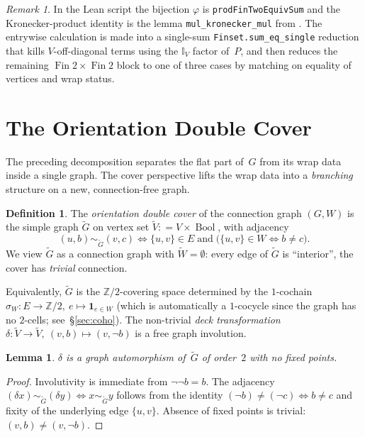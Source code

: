 \documentclass[11pt,a4paper]{amsart}
\theoremstyle{plain}
\newtheorem{lemma}[theorem]{Lemma}
\theoremstyle{definition}
\newtheorem{definition}[theorem]{Definition}
\theoremstyle{remark}
\newtheorem{remark}[theorem]{Remark}
\newcommand{\ZZ}{\mathbb{Z}}
\newcommand{\II}{\mathbb{I}}
\newcommand{\tG}{\widetilde{G}}
\newcommand{\tV}{\widetilde{V}}
\newcommand{\defeq}{\mathrel{\mathop:}=}
\begin{document}
\begin{remark}
In the Lean script the bijection $\varphi$ is
\texttt{prodFinTwoEquivSum} and the Kronecker-product
identity is the lemma \texttt{mul\_kronecker\_mul} from
. The entrywise
calculation is made into a single-sum \texttt{Finset.sum\_eq\_single}
reduction that kills $V$-off-diagonal terms using the
$\II_V$ factor of~$P$, and then reduces the remaining
$\operatorname{Fin}2\times \operatorname{Fin}2$ block to one of
three cases by matching on equality of vertices and wrap status.
\end{remark}

\section{The Orientation Double Cover}\label{sec:cover}

The preceding decomposition separates the flat part of~$G$ from
its wrap data inside a single graph. The cover perspective lifts
the wrap data into a \emph{branching} structure on a new,
connection-free graph.

\begin{definition}\label{def:cover}
The \emph{orientation double cover} of the connection graph
$(G,W)$ is the simple graph $\tG$ on vertex set
$\tV \defeq V\times \operatorname{Bool}$, with adjacency
\[
  (u,b)\sim_{\tG} (v,c) \iff
    \{u,v\}\in E \;\text{and}\; \bigl(\{u,v\}\in W \Leftrightarrow b\ne c\bigr).
\]
We view $\tG$ as a connection graph with $\widetilde W=\emptyset$:
every edge of $\tG$ is ``interior'', the cover has \emph{trivial}
connection.
\end{definition}

Equivalently, $\tG$ is the $\ZZ/2$-covering space determined by
the $1$-cochain $\sigma_W:E\to \ZZ/2,\ e\mapsto \mathbf{1}_{e\in W}$
(which is automatically a $1$-cocycle since the graph has no
$2$-cells; see~\S\ref{sec:coho}).
The non-trivial \emph{deck transformation}
$\delta:\tV\to\tV,\ (v,b)\mapsto (v,\neg b)$ is a free graph
involution.

\begin{lemma}\label{lem:deck}
  $\delta$ is a graph automorphism of~$\tG$ of order~$2$ with
  no fixed points.
\end{lemma}

\begin{proof}
Involutivity is immediate from $\neg\neg b = b$. The
adjacency $(\delta x)\sim_{\tG}(\delta y)\Leftrightarrow x\sim_{\tG}y$
follows from the identity
$(\neg b)\ne (\neg c) \Leftrightarrow b\ne c$ and fixity of the
underlying edge $\{u,v\}$. Absence of fixed points is trivial:
$(v,b)\ne (v,\neg b)$.
\end{proof}
\end{document}

